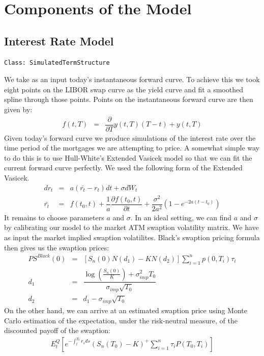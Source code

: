 \documentclass[10pt,letterpaper]{article}
\begin{document}
\section{Components of the Model}
\subsection{Interest Rate Model}
\begin{verbatim}
Class: SimulatedTermStructure
\end{verbatim}
We take as an input today's instantaneous forward curve. To achieve this we took eight points on the LIBOR swap curve as the yield curve and fit a smoothed spline through those points. Points on the instantaneous forward curve are then given by:
\begin{eqnarray}
f(t,T) & = & \dfrac{\partial}{\partial T} y(t,T)(T - t) + y(t,T)
\end{eqnarray}
Given today's forward curve we produce simulations of the interest rate over the time period of the mortgages we are attempting to price. A somewhat simple way to do this is to use Hull-White's Extended Vasicek model so that we can fit the current forward curve perfectly.
We used the following form of the Extended Vasicek.
\begin{eqnarray}
dr_t & = & a (\bar{r_t} - r_t)dt + \sigma dW_t\\
\bar{r_t} & = & f(t_0, t) + \dfrac{1}{a} \dfrac{\partial f(t_0,t)}{\partial t} + \dfrac{\sigma^2}{2a^2} \left( 1 - e^{-2a(t-t_0)} \right) 
\end{eqnarray}
It remains to choose parameters $a$ and $\sigma$. In an ideal setting, we can find $a$ and $\sigma$ by calibrating our model to the market ATM swaption volatility matrix. We have as input the market implied swaption volatilites. Black's swaption pricing formula then gives us the swaption prices:
\begin{eqnarray}
PS^{Black}(0) & = & [S_n(0) N(d_1) - K N(d_2)] \sum_{i=1}^n p(0, T_i) \tau_i \\
d_1 & = & \dfrac{\log(\frac{S_n(0)}{K}) + \sigma_{imp}^2 T_0}{\sigma_{imp} \sqrt{T_0}}\\
d_2 & = & d_1 - \sigma_{imp} \sqrt{T_0}
\end{eqnarray}
On the other hand, we can arrive at an estimated swaption price using Monte Carlo estimation of the expectation, under the risk-neutral measure, of the discounted payoff of the swaption:
\begin{eqnarray}
E_t^Q[e^{-\int_t^{T_0} r_s ds} (S_n(T_0) - K)^{+} \sum_{i=1}^n \tau_i P(T_0, T_i)]
\end{eqnarray}
\end{document}
